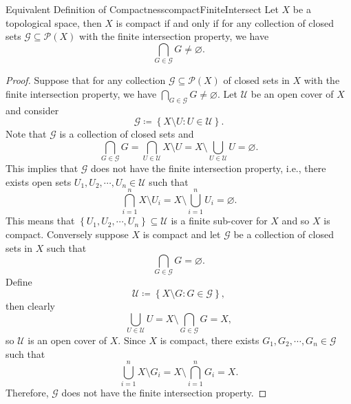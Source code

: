 \documentclass[math]{amznotes}
\theoremstyle{remark}
\begin{document}
\begin{probox}{Equivalent Definition of Compactness}{compactFiniteIntersect}
    Let $X$ be a topological space, then $X$ is compact if and only if for any collection of closed sets $\mathcal{G} \subseteq \mathcal{P}\left(X\right)$ with the finite intersection property, we have 
    \begin{equation*}
        \bigcap_{G \in \mathcal{G}}G \neq \varnothing.
    \end{equation*}
    \tcblower
    \begin{proof}
        Suppose that for any collection $\mathcal{G} \subseteq \mathcal{P}\left(X\right)$ of closed sets in $X$ with the finite intersection property, we have $\bigcap_{G \in \mathcal{G}}G \neq \varnothing$. Let $\mathcal{U}$ be an open cover of $X$ and consider 
        \begin{equation*}
            \mathcal{G} \coloneqq \left\{X \setminus U \colon U \in \mathcal{U}\right\}.
        \end{equation*}
        Note that $\mathcal{G}$ is a collection of closed sets and 
        \begin{equation*}
            \bigcap_{G \in \mathcal{G}}G = \bigcap_{U \in \mathcal{U}}X \setminus U = X \setminus \bigcup_{U \in \mathcal{U}}U = \varnothing.
        \end{equation*}
        This implies that $\mathcal{G}$ does not have the finite intersection property, i.e., there exists open sets $U_1, U_2, \cdots, U_n \in \mathcal{U}$ such that 
        \begin{equation*}
            \bigcap_{i = 1}^nX \setminus U_i = X \setminus \bigcup_{i = 1}^nU_i = \varnothing.
        \end{equation*}
        This means that $\left\{U_1, U_2, \cdots, U_n\right\} \subseteq \mathcal{U}$ is a finite sub-cover for $X$ and so $X$ is compact. Conversely suppose $X$ is compact and let $\mathcal{G}$ be a collection of closed sets in $X$ such that 
        \begin{equation*}
            \bigcap_{G \in \mathcal{G}}G = \varnothing.
        \end{equation*}
        Define 
        \begin{equation*}
            \mathcal{U} \coloneqq \left\{X \setminus G \colon G \in \mathcal{G}\right\},
        \end{equation*}
        then clearly 
        \begin{equation*}
            \bigcup_{U \in \mathcal{U}}U = X \setminus \bigcap_{G \in \mathcal{G}}G = X,
        \end{equation*}
        so $\mathcal{U}$ is an open cover of $X$. Since $X$ is compact, there exists $G_1, G_2, \cdots, G_n \in \mathcal{G}$ such that 
        \begin{equation*}
            \bigcup_{i = 1}^nX \setminus G_i = X \setminus \bigcap_{i = 1}^nG_i = X.
        \end{equation*}
        Therefore, $\mathcal{G}$ does not have the finite intersection property.
    \end{proof}
\end{probox}
\end{document}
